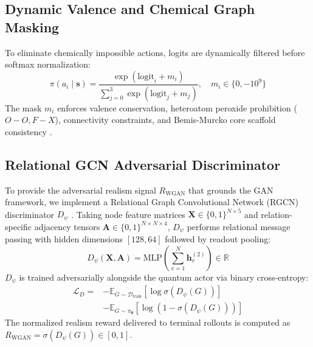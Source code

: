 \documentclass[conference]{IEEEtran}
\begin{document}
\subsection{Dynamic Valence and Chemical Graph Masking}
To eliminate chemically impossible actions, logits are dynamically filtered before softmax normalization:
\begin{equation}
    \pi(a_i \mid \mathbf{s}) = \frac{\exp(\text{logit}_i + m_i)}{\sum_{j=0}^{3} \exp(\text{logit}_j + m_j)}, \quad m_i \in \{0, -10^9\}
\end{equation}
The mask $m_i$ enforces valence conservation, heteroatom peroxide prohibition ($O-O, F-X$), connectivity constraints, and Bemis-Murcko core scaffold consistency \cite{bemis1996properties}.

\subsection{Relational GCN Adversarial Discriminator}
To provide the adversarial realism signal $R_{\text{WGAN}}$ that grounds the GAN framework, we implement a Relational Graph Convolutional Network (RGCN) discriminator $D_\psi$ \cite{schlichtkrull2018modeling}. Taking node feature matrices $\mathbf{X} \in \{0, 1\}^{N \times 5}$ and relation-specific adjacency tensors $\mathbf{A} \in \{0, 1\}^{N \times N \times 4}$, $D_\psi$ performs relational message passing with hidden dimensions $[128, 64]$ followed by readout pooling:
\begin{equation}
    D_\psi(\mathbf{X}, \mathbf{A}) = \text{MLP}\left(\sum_{v=1}^{N} \mathbf{h}_v^{(2)}\right) \in \mathbb{R}
\end{equation}
$D_\psi$ is trained adversarially alongside the quantum actor via binary cross-entropy:
\begin{align}
    \mathcal{L}_D = &-\mathbb{E}_{G \sim \mathcal{D}_{\text{train}}} [\log \sigma(D_\psi(G))] \nonumber \\
    &-\mathbb{E}_{G \sim \pi_{\boldsymbol{\theta}}} [\log(1 - \sigma(D_\psi(G)))]
\end{align}
The normalized realism reward delivered to terminal rollouts is computed as $R_{\text{WGAN}} = \sigma(D_\psi(G)) \in [0, 1]$.
\end{document}
